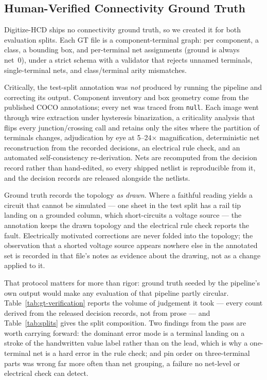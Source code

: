 \subsection{Human-Verified Connectivity Ground Truth}
\label{sec:gt}
Digitize-HCD ships no connectivity ground truth, so we created it for
both evaluation splits. Each GT file is a component-terminal graph: per
component, a class, a bounding box, and per-terminal net assignments
(ground is always net~0), under a strict schema with a validator that
rejects unnamed terminals, single-terminal nets, and class/terminal
arity mismatches.

Critically, the test-split annotation was \emph{not} produced by running
the pipeline and correcting its output. Component inventory and box
geometry come from the published COCO annotations; every net was traced
from \texttt{null}. Each image went through wire extraction under
hysteresis binarization, a criticality analysis that flips every
junction/crossing call and retains only the sites where the partition of
terminals changes, adjudication by eye at 5--24$\times$ magnification,
deterministic net reconstruction from the recorded decisions, an
electrical rule check, and an automated self-consistency re-derivation.
Nets are recomputed from the decision record rather than hand-edited, so
every shipped netlist is reproducible from it, and the decision records
are released alongside the netlists.

Ground truth records the topology \emph{as drawn}. Where a faithful
reading yields a circuit that cannot be simulated --- one sheet in the
test split has a rail tip landing on a grounded column, which
short-circuits a voltage source --- the annotation keeps the drawn
topology and the electrical rule check reports the fault. Electrically
motivated corrections are never folded into the topology; the
observation that a shorted voltage source appears nowhere else in the
annotated set is recorded in that file's notes as evidence about the
drawing, not as a change applied to it.

That protocol matters for more than rigor: ground truth seeded by the
pipeline's own output would make any evaluation of that pipeline
partly circular. Table~\ref{tab:gt-verification} reports the volume of
judgement it took --- every count derived from the released decision
records, not from prose --- and Table~\ref{tab:splits} gives the split
composition. Two findings from the pass are worth carrying forward: the
dominant error mode is a terminal landing on a stroke of the handwritten
value label rather than on the lead, which is why a one-terminal net is a
hard error in the rule check; and pin order on three-terminal parts was
wrong far more often than net grouping, a failure no net-level or
electrical check can detect.

